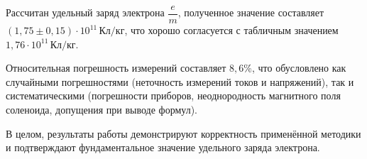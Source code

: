 \documentclass[14pt]{extarticle}
\begin{document}
Рассчитан удельный заряд электрона $\dfrac{e}{m}$, полученное значение составляет $(1{,}75 \pm 0{,}15) \cdot 10^{11}\,\text{Кл/кг}$, что хорошо согласуется с табличным значением $1{,}76 \cdot 10^{11}\,\text{Кл/кг}$.

Относительная погрешность измерений составляет $8{,}6\%$, что обусловлено как случайными погрешностями (неточность измерений токов и напряжений), так и систематическими (погрешности приборов, неоднородность магнитного поля соленоида, допущения при выводе формул).

В целом, результаты работы демонстрируют корректность применённой методики и подтверждают фундаментальное значение удельного заряда электрона.
\end{document}
